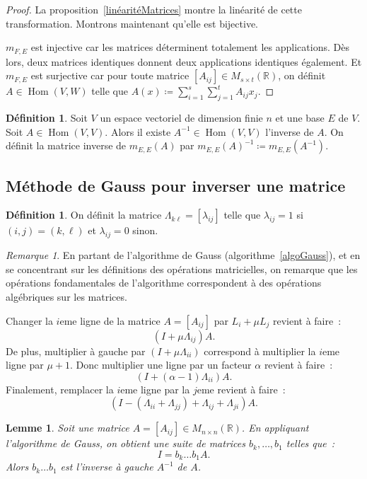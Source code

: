 \documentclass{article}
\DeclareMathOperator{\Hom}{Hom}
\newcommand{\R}{\mathbb R}
\newcommand{\M}[3]{M_{#1 \times #2}(#3)}
\newtheorem{lem}[thm]{Lemme}
\theoremstyle{definition}
\newtheorem{déf}[thm]{Définition}
\theoremstyle{remark}
\newtheorem*{rmq}{Remarque}
\begin{document}
		\begin{proof} La proposition~\ref{linéaritéMatrices} montre la linéarité de cette transformation. Montrons maintenant qu'elle est bijective.

		$m_{F, E}$ est injective car les matrices déterminent totalement les applications. Dès lors, deux matrices identiques donnent deux applications identiques
		également. Et $m_{F, E}$ est surjective car pour toute matrice $[A_{ij}] \in \M st\R$, on définit $A \in \Hom(V, W)$ telle que
		$A(x) \coloneqq \sum_{i=1}^s\sum_{j=1}^tA_{ij}x_j$. \end{proof}

		\begin{déf} Soit $V$ un espace vectoriel de dimension finie $n$ et une base $E$ de $V$. Soit $A \in \Hom(V, V)$. Alors il existe $A^{-1} \in \Hom(V, V)$ l'inverse
		de $A$. On définit la matrice inverse de $m_{E, E}(A)$ par $m_{E, E}(A)^{-1} \coloneqq m_{E, E}(A^{-1})$. \end{déf}

	\subsection{Méthode de Gauss pour inverser une matrice}
		\begin{déf} On définit la matrice $\Lambda_{k\ell} = [\lambda_{ij}]$ telle que $\lambda_{ij} = 1$ si $(i, j) = (k, \ell)$ et $\lambda_{ij} = 0$ sinon. \end{déf}

		\begin{rmq} En partant de l'algorithme de Gauss (algorithme~\ref{algoGauss}), et en se concentrant sur les définitions des opérations matricielles, on remarque
		que les opérations fondamentales de l'algorithme correspondent à des opérations algébriques sur les matrices.
		
		Changer la $i$eme ligne de la matrice $A = [A_{ij}]$ par $L_i + \mu L_j$ revient à faire~: \[(I + \mu \Lambda_{ij})A.\] De plus, multiplier à gauche par
		$(I + \mu\Lambda_{ii})$ correspond à multiplier la $i$eme ligne par $\mu+1$. Donc multiplier une ligne par un facteur $\alpha$ revient à faire~:
		\[(I + (\alpha-1)\Lambda_{ii})A.\] Finalement, remplacer la $i$eme ligne par la $j$eme revient à faire~:
		\[(I - (\Lambda_{ii} + \Lambda_{jj}) + \Lambda_{ij} + \Lambda_{ji})A.\] \end{rmq}

		\begin{lem} Soit une matrice $A = [A_{ij}] \in \M nn\R$. En appliquant l'algorithme de Gauss, on obtient une suite de matrices $b_k, \dotsc, b_1$ telles que~:
		\[I = b_k\ldots b_1A.\] Alors $b_k \ldots b_1$ est l'inverse à gauche $A^{-1}$ de $A$. \end{lem}
\end{document}
